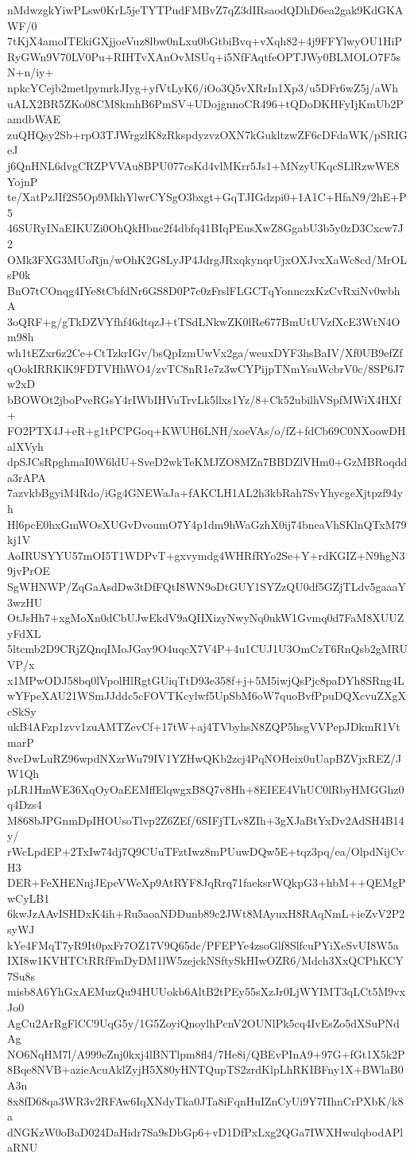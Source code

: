 nMdwzgkYiwPLsw0KrL5jeTYTPudFMBvZ7qZ3dIRsaodQDhD6ea2gak9KdGKAWF/0
7tKjX4amoITEkiGXjjoeVuz8lbw0nLxu0bGtbiBvq+vXqh82+4j9FFYlwyOU1HiP
RyGWn9V70LV0Pu+RIHTvXAnOvMSUq+i5NfFAqtfeOPTJWy0BLMOLO7F5sN+n/iy+
npkcYCejb2metlpymrkJIyg+yfVtLyK6/iOo3Q5vXRrIn1Xp3/u5DFr6wZ5j/aWh
uALX2BR5ZKo08CM8kmhB6PmSV+UDojgnnoCR496+tQDoDKHFyIjKmUb2PamdbWAE
zuQHQsy2Sb+rpO3TJWrgzlK8zRkspdyzvzOXN7kGukltzwZF6cDFdaWK/pSRIGeJ
j6QnHNL6dvgCRZPVVAu8BPU077csKd4vlMKrr5Js1+MNzyUKqcSLlRzwWE8YojnP
te/XatPzJIf2S5Op9MkhYlwrCYSgO3bxgt+GqTJIGdzpi0+1A1C+HfaN9/2hE+P5
46SURyINaEIKUZi0OhQkHbnc2f4dbfq41BIqPEusXwZ8GgabU3b5y0zD3Cxcw7J2
OMk3FXG3MUoRjn/wOhK2G8LyJP4JdrgJRxqkynqrUjxOXJvxXaWc8cd/MrOLsP0k
BnO7tCOnqg4IYe8tCbfdNr6GS8D0P7c0zFrslFLGCTqYonnczxKzCvRxiNv0wbhA
3oQRF+g/gTkDZVYfhf46dtqzJ+tTSdLNkwZK0lRe677BmUtUVzfXcE3WtN4Om98h
wh1tEZxr6z2Ce+CtTzkrIGv/bsQpIzmUwVx2ga/weuxDYF3hsBaIV/Xf0UB9efZf
qOokIRRKlK9FDTVHhWO4/zvTC8nR1e7z3wCYPijpTNmYsuWcbrV0c/8SP6J7w2xD
bBOWOt2jboPveRGsY4rIWbIHVuTrvLk5llxs1Yz/8+Ck52ubilhVSpfMWiX4HXf+
FO2PTX4J+eR+g1tPCPGoq+KWUH6LNH/xoeVAs/o/fZ+fdCb69C0NXoowDHalXVyh
dpSJCsRpghmaI0W6ldU+SveD2wkTeKMJZO8MZn7BBDZlVHm0+GzMBRoqdda3rAPA
7azvkbBgyiM4Rdo/iGg4GNEWaJa+fAKCLH1AL2h3kbRah7SvYhycgeXjtpzf94yh
Hl6pcE0hxGmWOsXUGvDvoumO7Y4p1dm9hWaGzhX0ij74bneaVhSKlnQTxM79kj1V
AoIRUSYYU57mOI5T1WDPvT+gxvymdg4WHRfRYo2Se+Y+rdKGIZ+N9hgN39jvPrOE
SgWHNWP/ZqGaAsdDw3tDfFQtI8WN9oDtGUY1SYZzQU0df5GZjTLdv5gaaaY3wzHU
OtJsHh7+xgMoXn0dCbUJwEkdV9aQIIXizyNwyNq0ukW1Gvmq0d7FaM8XUUZyFdXL
5ltcmb2D9CRjZQnqIMoJGay9O4uqcX7V4P+4u1CUJ1U3OmCzT6RnQsb2gMRUVP/x
x1MPwODJ58bq0lVpolHlRgtGUiqTtD93e358f+j+5M5iwjQsPjc8paDYh8SRng4L
wYFpeXAU21WSmJJddc5cFOVTKcylwf5UpSbM6oW7quoBvfPpuDQXcvuZXgXcSkSy
ukB4AFzp1zvv1zuAMTZevCf+17tW+aj4TVbyhsN8ZQP5hsgVVPepJDkmR1VtmarP
8vcDwLuRZ96wpdNXzrWu79IV1YZHwQKb2zcj4PqNOHeix0uUapBZVjxREZ/JW1Qh
pLR1HmWE36XqOyOaEEMffElqwgxB8Q7v8Hh+8EIEE4VhUC0lRbyHMGGhz0q4Dzs4
M868bJPGnmDpIHOUsoTlvp2Z6ZEf/6SIFjTLv8ZIh+3gXJaBtYxDv2AdSH4B14y/
rWcLpdEP+2TxIw74dj7Q9CUuTFztIwz8mPUuwDQw5E+tqz3pq/ea/OlpdNijCvH3
DER+FeXHENnjJEpeVWeXp9AtRYF8JqRrq71faeksrWQkpG3+hbM++QEMgPwCyLB1
6kwJzAAvISHDxK4ih+Ru5aoaNDDunb89c2JWt8MAyuxH8RAqNmL+ieZvV2P2syWJ
kYe4FMqT7yR9It0pxFr7OZ17V9Q65dc/PFEPYe4zsoGlf8SlfcuPYiXeSvUI8W5a
IXI8w1KVHTCtRRfFmDyDM1lW5zejckNSftySkHIwOZR6/Mdch3XxQCPhKCY7Su8s
misb8A6YhGxAEMuzQu94HUUokb6AltB2tPEy55sXzJr0LjWYIMT3qLCt5M9vxJo0
AgCu2ArRgFlCC9UqG5y/1G5ZoyiQnoylhPcnV2OUNlPk5cq4IvEsZo5dXSuPNdAg
NO6NqHM7l/A999eZnj0kxj4lBNTlpm8fl4/7He8i/QBEvPInA9+97G+fGt1X5k2P
8Bqe8NVB+azieAcuAklZyjH5X80yHNTQupTS2zrdKlpLhRKIBFny1X+BWlaB0A3n
8x8fD68qa3WR3v2RFAw6IqXNdyTka0JTa8iFqnHuIZnCyUi9Y7IIhnCrPXbK/k8a
dNGKzW0oBaD024DaHidr7Sa9sDbGp6+vD1DfPxLxg2QGa7IWXHwulqbodAPlaRNU
